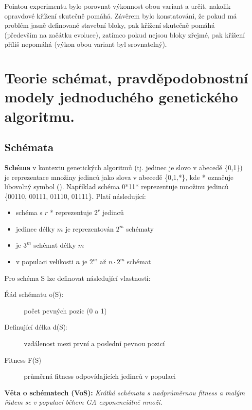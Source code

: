 Pointou experimentu bylo porovnat výkonnost obou variant a určit, nakolik opravdové křížení skutečně pomáhá. Závěrem bylo konstatování, že pokud má problém jasně definované stavební bloky, pak křížení skutečně pomáhá (především na začátku evoluce), zatímco pokud nejsou bloky zřejmé, pak křížení příliš nepomáhá (výkon obou variant byl srovnatelný).

\section{Teorie schémat, pravděpodobnostní modely jednoduchého genetického algoritmu.}
\subsection{Schémata}
\textbf{Schéma} v kontextu genetických algoritmů (tj. jedinec je slovo v abecedě \{0,1\}) je reprezentace množiny jedinců jako slova v abecedě \{0,1,*\}, kde * označuje libovolný symbol (). Například schéma 0*11* reprezentuje množinu jedinců \{00110, 00111, 01110, 01111\}. Platí následující:
\begin{itemize}
	
	
	\item schéma s $r$ * reprezentuje $2^r$ jedinců
	\item jedinec délky $m$ je reprezentován $2^m$ schématy
	\item je $3^m$ schémat délky $m$
	\item v populaci velikosti $n$ je $2^m$ až $n\cdot2^m$ schémat
\end{itemize}
Pro schéma S lze definovat následující vlastnosti:
\begin{description}
	
	
	\item[Řád schématu o(S):] počet pevných pozic (0 a 1) 
	\item[Definující délka d(S):] vzdálenost mezi první a poslední pevnou pozicí
	\item[Fitness F(S)] průměrná fitness odpovídajících jedinců v populaci
\end{description}

\noindent\textbf{Věta o schématech (VoS):} \textit{Krátká schémata s nadprůměrnou fitness a malým řádem se v populaci během GA exponenciálně množí.}


